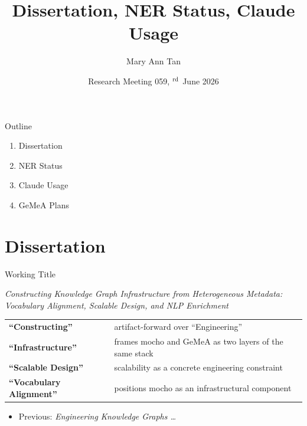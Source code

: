 \documentclass[xcolor,aspectratio=169,compress]{beamer}
\title[RM 059 --- Dissertation, NER, Claude]{Dissertation, NER Status, Claude Usage}
\author[M.A.\ Tan]{Mary Ann Tan}
\institute[FIZ-KDAI]{FIZ Karlsruhe -- Leibniz Institute for Information Infrastructure, KDAI}
\date[RM 059, 03.06.2026]{Research Meeting 059, {\sansmath 3$^{\rm rd}$} June 2026}
\begin{document}
\frame[plain]{\titlepage}

\begin{frame}{Outline}
  \begin{enumerate}
    \item Dissertation
    \item NER Status
    \item Claude Usage
    \item GeMeA Plans
  \end{enumerate}
\end{frame}

\section{Dissertation}

\begin{frame}{Working Title}
  \begin{block}{}
    \large
    \textit{Constructing Knowledge Graph Infrastructure from Heterogeneous Metadata:
    Vocabulary Alignment, Scalable Design, and NLP Enrichment}
  \end{block}
  \smallskip
  \footnotesize
  \begin{tabular}{lp{8.5cm}}
    \toprule
    \textbf{``Constructing''} & artifact-forward over ``Engineering'' \\
    \textbf{``Infrastructure''} & frames mocho and GeMeA as two layers of the same stack \\
    \textbf{``Scalable Design''} & scalability as a concrete engineering constraint \\
    \textbf{``Vocabulary Alignment''} & positions mocho as an infrastructural component \\
    \bottomrule
  \end{tabular}
  \smallskip

  \begin{itemize}\setlength{\itemsep}{2pt}
    \item Previous: \textit{Engineering Knowledge Graphs \ldots}
  \end{itemize}
\end{frame}
\end{document}
